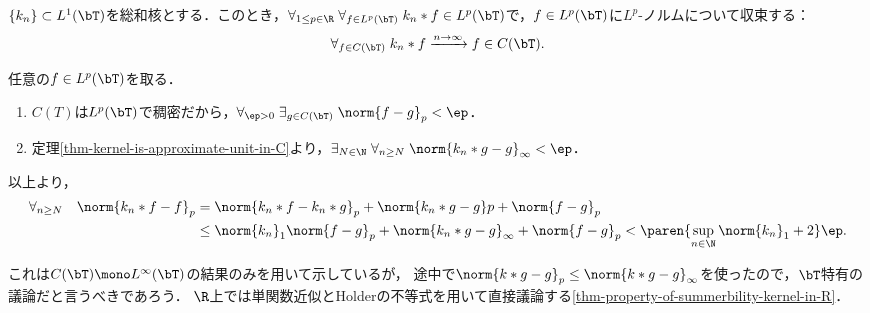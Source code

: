 \documentclass[uplatex,dvipdfmx]{jsreport}
\begin{document}
\begin{theorem}\label{thm-kernel-is-approximate-unit-in-Lp}
    $\{k_n\}\subset L^1(\bT)$を総和核とする．このとき，$\forall_{1\le p\in\R}\;\forall_{f\in L^p(\bT)}\;k_n*f\in L^p(\bT)$で，$f\in L^p(\bT)$に$L^p$-ノルムについて収束する：
    \[\forall_{f\in C(\bT)}\;k_n*f\xrightarrow{n\to\infty}f\in C(\bT).\]
\end{theorem}
\begin{Proof}
    任意の$f\in L^p(\bT)$を取る．
    \begin{enumerate}
        \item $C(T)$は$L^p(\bT)$で稠密だから，$\forall_{\ep>0}\;\exists_{g\in C(\bT)}\;\norm{f-g}_p<\ep$．
        \item 定理\ref{thm-kernel-is-approximate-unit-in-C}より，$\exists_{N\in\N}\;\forall_{n\ge N}\;\norm{k_n*g-g}_\infty<\ep$．
    \end{enumerate}
    以上より，
    \begin{align*}
        \forall_{n\ge N}\quad\norm{k_n*f-f}_p&=\norm{k_n*f-k_n*g}_p+\norm{k_n*g-g}p+\norm{f-g}_p\\
        &\le\norm{k_n}_1\norm{f-g}_p+\norm{k_n*g-g}_\infty+\norm{f-g}_p
        <\paren{\sup_{n\in\N}\norm{k_n}_1+2}\ep.
    \end{align*}
\end{Proof}
\begin{remarks}
    これは$C(\bT)\mono L^\infty(\bT)$の結果のみを用いて示しているが，
    途中で$\norm{k*g-g}_p\le\norm{k*g-g}_\infty$を使ったので，$\bT$特有の議論だと言うべきであろう．
    $\R$上では単関数近似とHolderの不等式を用いて直接議論する\ref{thm-property-of-summerbility-kernel-in-R}．
\end{remarks}
\end{document}
